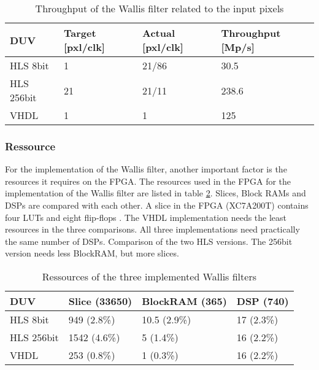 \begin{table}[tb!]
    \centering
    \begin{tabular}{l l l l}
        \toprule
        DUV & Target [pxl/clk] & Actual [pxl/clk]  & Throughput [Mp/s]\\
        \midrule
        HLS 8bit    & 1     & 21/86     & 30.5\\
        HLS 256bit  & 21    & 21/11     & 238.6 \\
        VHDL        & 1     & 1         & 125 \\
        \bottomrule
    \end{tabular}
    \caption{Throughput of the Wallis filter related to the input pixels}
    \label{tab:throughput}
\end{table}


\subsubsection*{Ressource}
For the implementation of the Wallis filter, another important factor is the
resources it requires on the FPGA. The resources used in the FPGA for the
implementation of the Wallis filter are listed in table \ref{tab:ressource}.
Slices, Block RAMs and DSPs are compared with each other. A slice in the FPGA 
(XC7A200T) contains four LUTs and eight flip-flops \cite{ds180}.
The VHDL implementation needs the least resources in the three comparisons. All
three implementations need practically the same number of DSPs. Comparison of
the two HLS versions. The 256bit version needs less BlockRAM, but more slices.

\begin{table}[tb!]
    \centering
    \begin{tabular}{l l l l}
        \toprule
        DUV         & Slice (33650) & BlockRAM (365) & DSP (740) \\
        \midrule
        HLS 8bit    & 949 (2.8\%)   & 10.5 (2.9\%)  & 17 (2.3\%) \\
        HLS 256bit  & 1542 (4.6\%)  & 5 (1.4\%)     & 16 (2.2\%) \\
        VHDL        & 253 (0.8\%)   & 1 (0.3\%)     & 16 (2.2\%) \\
        \bottomrule
    \end{tabular}
    \caption{Ressources of the three implemented Wallis filters}
    \label{tab:ressource}
\end{table}


%
%
